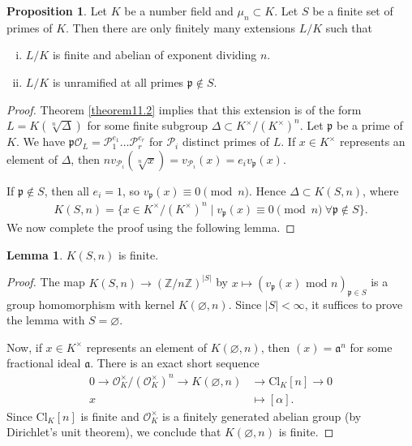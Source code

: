 \documentclass{article}
\theoremstyle{definition}
\newtheorem{lemma}[theorem]{Lemma}
\newtheorem{prop}[theorem]{Proposition}
\begin{document}
\begin{prop}\label{prop11.3}
    Let $K$ be a number field and $\mu_n \subset K$. Let $S$ be a finite set of primes of $K$. Then there are only finitely many extensions $L/K$ such that
    \begin{enumerate}[(i)]
        \item $L/K$ is finite and abelian of exponent dividing $n$.
        \item $L/K$ is unramified at all primes $\mathfrak{p} \not\in S$.
    \end{enumerate}
\end{prop}
\begin{proof}
    Theorem \ref{theorem11.2} implies that this extension is of the form $L = K(\sqrt[n]{\Delta})$ for some finite subgroup $\Delta \subset K^\times/(K^\times)^n$. Let $\mathfrak{p}$ be a prime of $K$. We have $\mathfrak{p}\mathcal{O}_L = \mathcal{P}_1^{e_1}\ldots \mathcal{P}_r^{e_r}$ for $\mathcal{P}_i$ distinct primes of $L$. If $x \in K^\times$ represents an element of $\Delta$, then $n v_{\mathcal{P}_i}(\sqrt[n]{x}) = v_{\mathcal{P}_i}(x) = e_i v_{\mathfrak{p}}(x)$. \vspace{1mm}
     
    If $\mathfrak{p} \not\in S$, then all $e_i=1$, so $v_{\mathfrak{p}}(x) \equiv 0 \pmod{n}$. Hence $\Delta \subset K(S,n)$, where
    \begin{align*}
        K(S,n) = \{x \in K^\times/(K^\times)^n \mid v_{\mathfrak{p}}(x)\equiv 0\pmod{n}~\forall \mathfrak{p} \not\in S\}.
    \end{align*}
    We now complete the proof using the following lemma.
\end{proof}
\begin{lemma}\label{lemma11.4}
    $K(S,n)$ is finite.
\end{lemma}
\begin{proof}
    The map $K(S,n) \to (\mathbb{Z}/n\mathbb{Z})^{\left|S\right|}$ by $x \mapsto (v_{\mathfrak{p}}(x) \text{ mod }n)_{\mathfrak{p} \in S}$ is a group homomorphism with kernel $K(\varnothing,n)$. Since $\left|S\right|<\infty$, it suffices to prove the lemma with $S=\varnothing$. 
    \vspace{1mm}
     
    Now, if $x \in K^\times$ represents an element of $K(\varnothing,n)$, then $(x) = \mathfrak{a}^n$ for some fractional ideal $\mathfrak{a}$. There is an exact short sequence
    \begin{align*}
        0 \to \mathcal{O}_K^\times/(\mathcal{O}_K^\times)^n \to K(\varnothing,n) &\to \text{Cl}_K[n] \to 0\\
        x &\mapsto [\mathfrak{\alpha}].
    \end{align*}
    Since $\text{Cl}_K[n]$ is finite and $\mathcal{O}_K^\times$ is a finitely generated abelian group (by Dirichlet's unit theorem), we conclude that $K(\varnothing,n)$ is finite.
\end{proof}
\end{document}
